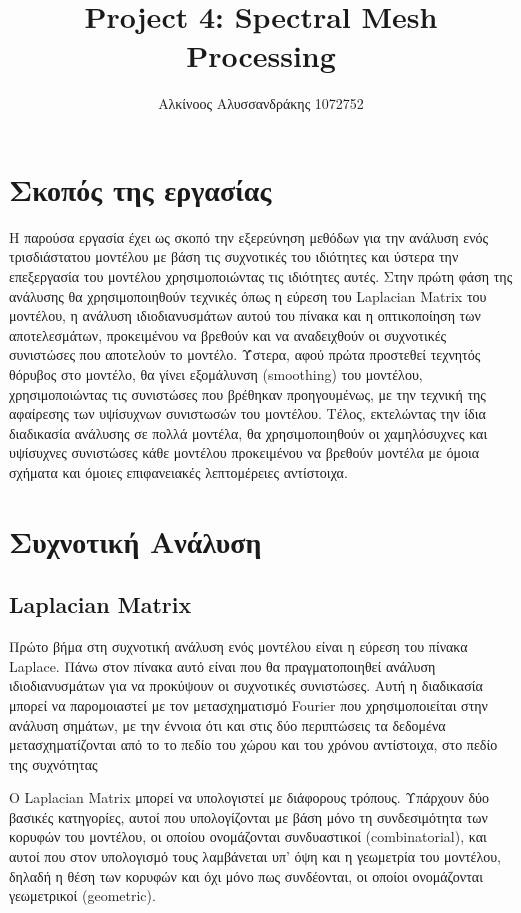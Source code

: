 \documentclass[draft]{article}
\title{Project 4: Spectral Mesh Processing}
\author{Αλκίνοος Αλυσσανδράκης 1072752}
\date{}
\begin{document}
\maketitle

\vfill
\tableofcontents
\vfill
\newpage

\section{Σκοπός της εργασίας}
Η παρούσα εργασία έχει ως σκοπό την εξερεύνηση μεθόδων για την ανάλυση ενός τρισδιάστατου
μοντέλου με βάση τις συχνοτικές του ιδιότητες και ύστερα την επεξεργασία του
μοντέλου χρησιμοποιώντας τις ιδιότητες αυτές. Στην πρώτη φάση της ανάλυσης θα
χρησιμοποιηθούν τεχνικές όπως η εύρεση του Laplacian Matrix του μοντέλου, η ανάλυση
ιδιοδιανυσμάτων αυτού του πίνακα και η οπτικοποίηση των αποτελεσμάτων, προκειμένου να
βρεθούν και να αναδειχθούν οι συχνοτικές συνιστώσες που αποτελούν το μοντέλο. Ύστερα,
αφού πρώτα προστεθεί τεχνητός θόρυβος στο μοντέλο, θα γίνει εξομάλυνση (smoothing) του
μοντέλου, χρησιμοποιώντας τις συνιστώσες που βρέθηκαν προηγουμένως, με την τεχνική της
αφαίρεσης των υψίσυχνων συνιστωσών του μοντέλου. Τέλος, εκτελώντας την ίδια διαδικασία
ανάλυσης σε πολλά μοντέλα, θα χρησιμοποιηθούν οι χαμηλόσυχνες και υψίσυχνες συνιστώσες
κάθε μοντέλου προκειμένου να βρεθούν μοντέλα με όμοια σχήματα και όμοιες επιφανειακές
λεπτομέρειες αντίστοιχα.

\section{Συχνοτική Ανάλυση}

\subsection{Laplacian Matrix}
Πρώτο βήμα στη συχνοτική ανάλυση ενός μοντέλου είναι η εύρεση του πίνακα Laplace. Πάνω
στον πίνακα αυτό είναι που θα πραγματοποιηθεί ανάλυση ιδιοδιανυσμάτων για να προκύψουν οι
συχνοτικές συνιστώσες. Αυτή η διαδικασία μπορεί να παρομοιαστεί με τον μετασχηματισμό
Fourier που χρησιμοποιείται στην ανάλυση σημάτων, με την έννοια ότι και στις δύο
περιπτώσεις τα δεδομένα μετασχηματίζονται από το το πεδίο του χώρου και του χρόνου
αντίστοιχα, στο πεδίο της συχνότητας

Ο Laplacian Matrix μπορεί να υπολογιστεί με διάφορους τρόπους.
Υπάρχουν δύο βασικές κατηγορίες,
αυτοί που υπολογίζονται με βάση μόνο τη συνδεσιμότητα των κορυφών του μοντέλου,
οι οποίου ονομάζονται συνδυαστικοί (combinatorial),
και αυτοί που στον υπολογισμό τους λαμβάνεται υπ' όψη και η γεωμετρία του μοντέλου,
δηλαδή η θέση των κορυφών και όχι μόνο πως συνδέονται,
οι οποίοι ονομάζονται γεωμετρικοί (geometric).
\end{document}
